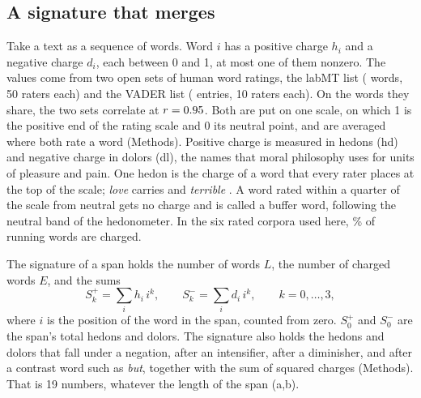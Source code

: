 \subsection{A signature that merges}

Take a text as a sequence of words. Word $i$ has a positive charge $h_i$ and a negative charge $d_i$, each between 0 and 1, at most one of them nonzero. The values come from two open sets of human word ratings, the labMT list\cite{dodds2011} (\nLabmt{} words, 50 raters each) and the VADER list\cite{hutto2014} (\nVader{} entries, 10 raters each). On the \nShared{} words they share, the two sets correlate at $r=0.95$. Both are put on one scale, on which 1 is the positive end of the rating scale and 0 its neutral point, and are averaged where both rate a word (Methods). Positive charge is measured in hedons (hd) and negative charge in dolors (dl), the names that moral philosophy uses for units of pleasure and pain\cite{mackaye1906,feldman1978}. One hedon is the charge of a word that every rater places at the top of the scale; \emph{love} carries \hdLove\hd{} and \emph{terrible} \dlTerrible\dl. A word rated within a quarter of the scale from neutral gets no charge and is called a buffer word, following the neutral band of the hedonometer\cite{dodds2011}. In the six rated corpora used here, \chargedShare\% of running words are charged.

The signature of a span holds the number of words $L$, the number of charged words $E$, and the sums
\begin{equation}
S^{+}_{k}=\sum_{i} h_i\, i^{k},\qquad S^{-}_{k}=\sum_{i} d_i\, i^{k},\qquad k=0,\dots,3,
\end{equation}
where $i$ is the position of the word in the span, counted from zero. $S^{+}_{0}$ and $S^{-}_{0}$ are the span's total hedons and dolors. The signature also holds the hedons and dolors that fall under a negation, after an intensifier, after a diminisher, and after a contrast word such as \emph{but}, together with the sum of squared charges (Methods). That is 19 numbers, whatever the length of the span (a,b).

